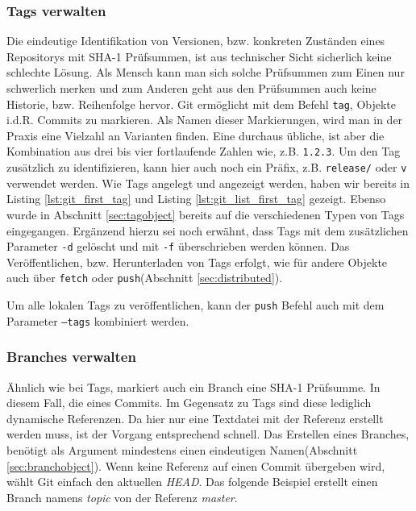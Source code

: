 \subsubsection{Tags verwalten}\label{sec:managetags}
Die eindeutige Identifikation von Versionen, bzw. konkreten Zuständen eines
Repositorys mit \gls{SHA-1} Prüfsummen, ist aus technischer Sicht sicherlich
keine schlechte Lösung. Als Mensch kann man sich solche Prüfsummen zum Einen
nur schwerlich merken und zum Anderen geht aus den Prüfsummen auch keine
Historie, bzw. Reihenfolge hervor. Git ermöglicht mit dem Befehl \texttt{tag},
Objekte i.d.R. Commits zu markieren. Als Namen dieser Markierungen, wird man in
der Praxis eine Vielzahl an Varianten finden. Eine durchaus übliche, ist aber
die Kombination aus drei bis vier fortlaufende Zahlen wie, z.B. \texttt{1.2.3}.
Um den Tag zusätzlich zu identifizieren, kann hier auch noch ein Präfix, z.B.
\texttt{release/} oder \texttt{v} verwendet werden. Wie Tags angelegt und
angezeigt werden, haben wir bereits in Listing \ref{lst:git_first_tag} und
Listing \ref{lst:git_list_first_tag} gezeigt. Ebenso wurde in Abschnitt
\ref{sec:tagobject} bereits auf die verschiedenen Typen von Tags eingegangen.
Ergänzend hierzu sei noch erwähnt, dass Tags mit dem zusätzlichen Parameter
\texttt{-d} gelöscht und mit \texttt{-f} überschrieben werden können.
Das Veröffentlichen, bzw. Herunterladen von Tags erfolgt, wie für andere Objekte
auch über \texttt{fetch} oder \texttt{push}(Abschnitt \ref{sec:distributed}).


Um alle lokalen Tags zu veröffentlichen, kann der \texttt{push} Befehl auch mit
dem Parameter \texttt{--tags} kombiniert werden.\cite[70-71,162-163]{gitosp}


\subsubsection{Branches verwalten} Ähnlich wie bei Tags, markiert auch ein
Branch eine \gls{SHA-1} Prüfsumme. In diesem Fall, die eines Commits. Im
Gegensatz zu Tags sind diese lediglich dynamische Referenzen. Da hier nur eine
Textdatei mit der Referenz erstellt werden muss, ist der Vorgang entsprechend
schnell. Das Erstellen eines Branches, benötigt als Argument mindestens einen
eindeutigen Namen(Abschnitt \ref{sec:branchobject}). Wenn keine Referenz auf
einen Commit übergeben wird, wählt Git einfach den aktuellen \textit{HEAD}.
Das folgende Beispiel erstellt einen Branch namens \textit{topic} von der
Referenz \textit{master}.

